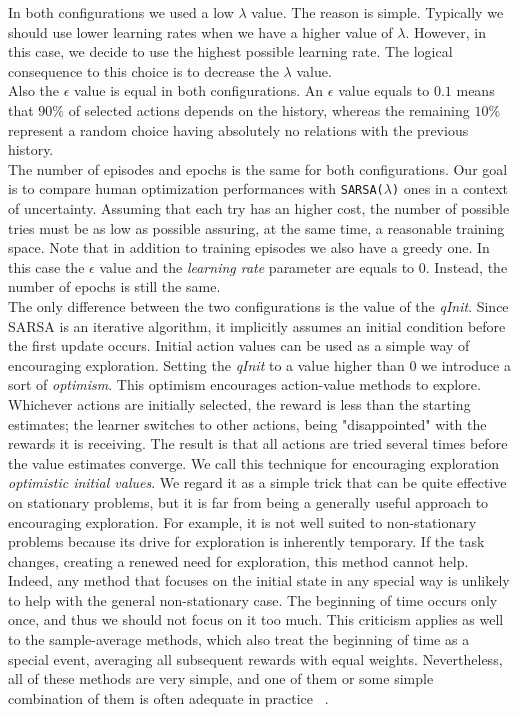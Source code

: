 In both configurations we used a low $\lambda$ value. The reason is simple. Typically we should use lower learning rates when we have a higher value of $\lambda$. However, in this case, we decide to use the highest possible learning rate. The logical consequence to this choice is to decrease the $\lambda$ value. \\

Also the $\epsilon$ value is equal in both configurations. An $\epsilon$ value equals to $0.1$ means that $90\%$ of selected actions depends on the history, whereas the remaining $10\%$ represent a random choice having absolutely no relations with the previous history. \\ 

The number of episodes and epochs is the same for both configurations. Our goal is to compare human optimization performances with {\tt SARSA($\lambda$)} ones in a context of uncertainty. Assuming that each try has an higher cost, the number of possible tries must be as low as possible assuring, at the same time, a reasonable training space. Note that in addition to training episodes we also have a greedy one. In this case the $\epsilon$ value and the \textit{learning rate} parameter are equals to $0$. Instead, the number of epochs is still the same.  \\

The only difference between the two configurations is the value of the \textit{qInit}. Since SARSA is an iterative algorithm, it implicitly assumes an initial condition before the first update occurs. Initial action values can be used as a simple way of encouraging exploration. Setting the \textit{qInit} to a value higher than $0$ we introduce a sort of \textit{optimism}. This optimism encourages action-value methods to explore. Whichever actions are initially selected, the reward is less than the starting estimates; the learner switches to other actions, being "disappointed" with the rewards it is receiving. The result is that all actions are tried several times before the value estimates converge. We call this technique for encouraging exploration \textit{optimistic initial values}. We regard it as a simple trick that can be quite effective on stationary problems, but it is far from being a generally useful approach to encouraging exploration. For example, it is not well suited to non-stationary problems because its drive for exploration is inherently temporary. If the task changes, creating a renewed need for exploration, this method cannot help. Indeed, any method that focuses on the initial state in any special way is unlikely to help with the general non-stationary case. The beginning of time occurs only once, and thus we should not focus on it too much. This criticism applies as well to the sample-average methods, which also treat the beginning of time as a special event, averaging all subsequent rewards with equal weights. Nevertheless, all of these methods are very simple, and one of them or some simple combination of them is often adequate in practice ~\cite{SuttonBarto}.

